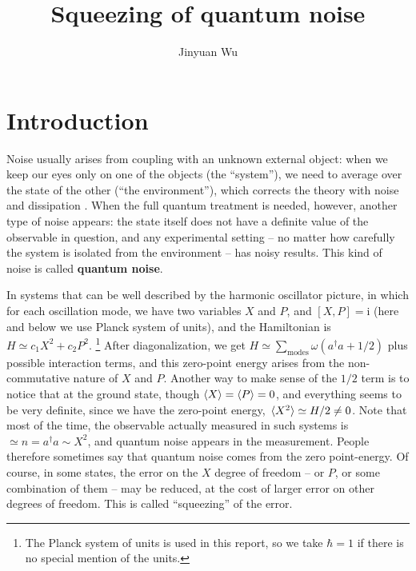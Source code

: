 \documentclass[hyperref, a4paper]{article}
\title{Squeezing of quantum noise}
\author{Jinyuan Wu}
\newcommand*{\ii}{\mathrm{i}}
\newcommand*{\concept}[1]{{\textbf{#1}}}
\begin{document}
    
\maketitle

\section{Introduction}

Noise usually arises from coupling with an unknown external object:
when we keep our eyes only on one of the objects (the ``system''),
we need to average over the state of the other (``the environment''),
which corrects the theory with noise and dissipation \cite{zwanzig_nonequilibrium_2001}.
When the full quantum treatment is needed,
however, another type of noise appears:
the state itself does not have a definite value of the observable in question, 
and any experimental setting 
-- no matter how carefully the system is isolated from the environment -- 
has noisy results.
This kind of noise is called \concept{quantum noise}.

In systems that can be well described by 
the harmonic oscillator picture,
in which for each oscillation mode, 
we have two variables $X$ and $P$, and $[X, P] = \ii$
(here and below we use Planck system of units),
and the Hamiltonian is $H \simeq c_1 X^2 + c_2 P^2$.%
\footnote{
    The Planck system of units is used in this report, 
    so we take $\hbar = 1$ if there is no special mention of the units.
}
After diagonalization, we get $H \simeq \sum_{\text{modes}} \omega (a^\dagger a + 1/2)$ 
plus possible interaction terms,
and this zero-point energy arises from the non-commutative nature of $X$ and $P$.
Another way to make sense of the $1/2$ term is to notice that at the ground state,
though $\expval{X} = \expval{P} = 0$,
and everything seems to be very definite,
since we have the zero-point energy,
$\expval*{X^2} \simeq H / 2 \neq 0$.
Note that most of the time, the observable actually measured in such systems 
is $\simeq n = a^\dagger a \sim X^2$,
and quantum noise appears in the measurement.
People therefore sometimes say that 
quantum noise comes from the zero point-energy.
Of course, in some states, 
the error on the $X$ degree of freedom -- or $P$, or some combination of them -- 
may be reduced,
at the cost of larger error on other degrees of freedom.
This is called ``squeezing'' of the error.

\end{document}
